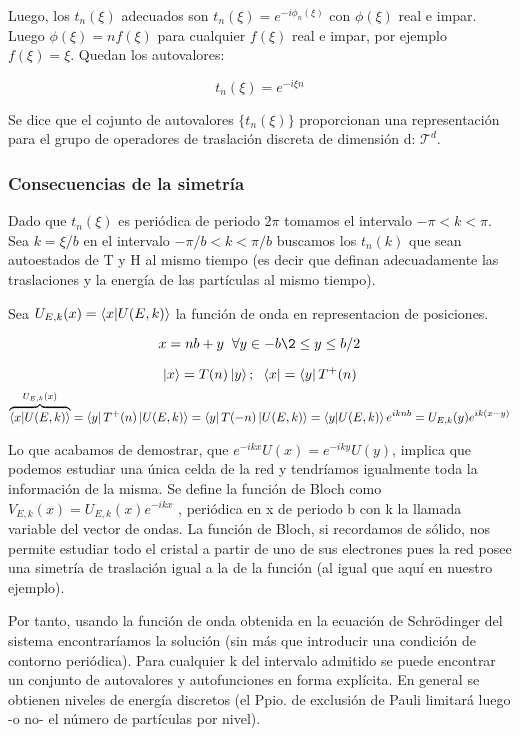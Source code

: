 \documentclass{article}
\begin{document}
Luego, los $t_n(\xi)$ adecuados son $ t_n(\xi)=e^{-i\phi _n(\xi)}$ con $\phi (\xi)$ real e impar. Luego $\phi (\xi)=nf(\xi)$ para cualquier $f(\xi)$ real e impar, por ejemplo $f(\xi)=\xi$. Quedan los autovalores:

$$t_n(\xi)=e^{-i\xi n}$$

Se dice que el cojunto de autovalores $\lbrace t_n(\xi) \rbrace$ proporcionan una representación para el grupo de operadores de traslación discreta de dimensión d: $\mathcal{T}^d$.

\subsubsection{Consecuencias de la simetría}
Dado que $t_n(\xi)$ es periódica de periodo $2\pi$  tomamos el intervalo $-\pi <k<\pi$. Sea $k=\xi/b$ en el intervalo $-\pi/b<k<\pi/b$ buscamos los $t_n(k)$ que sean autoestados de T y H al mismo tiempo (es decir que definan adecuadamente las traslaciones y la energía de las partículas al mismo tiempo).

\smallskip
Sea $U_{E,k}(x)=\braket{x|U(E,k)}$ la función de onda en representacion de posiciones.

$$x=nb+y \hspace{0.2cm} \forall y \in -b\2\leq y \leq b/2$$

$$\ket{x}=T(n)\ket{y}; \hspace{0.2cm}\bra{x}=\bra{y}T^+(n)$$
$$\overbrace{\braket{x|U(E,k)}}^{U_{E,k}(x)}=\bra{y}T^+(n)\ket{U(E,k)}=\bra{y}T(-n)\ket{U(E,k)}=\braket{y|U(E,k)}e^{iknb}=U_{E,k}(y)e^{ik(x-y)}$$

Lo que acabamos de demostrar, que $e^{-ikx}U(x)=e^{-iky}U(y)$, implica que podemos estudiar una única celda de la red y tendríamos igualmente toda la información de la misma. Se define la función de Bloch como $V_{E,k}(x)=U_{E,k}(x)e^{-ikx}$ , periódica en x de periodo b con k la llamada variable del vector de ondas. La función de Bloch, si recordamos de sólido, nos permite estudiar todo el cristal a partir de uno de sus electrones pues la red posee una simetría de traslación igual a la de la función (al igual que aquí en nuestro ejemplo).
\newpage

Por tanto, usando la función de onda obtenida en la ecuación de Schrödinger del sistema encontraríamos la solución (sin más que introducir una condición de contorno periódica). Para cualquier k del intervalo admitido se puede encontrar un conjunto de autovalores y autofunciones en forma explícita. En general se obtienen niveles de energía discretos (el Ppio. de exclusión de Pauli limitará luego -o no- el número de partículas por nivel).
\end{document}

